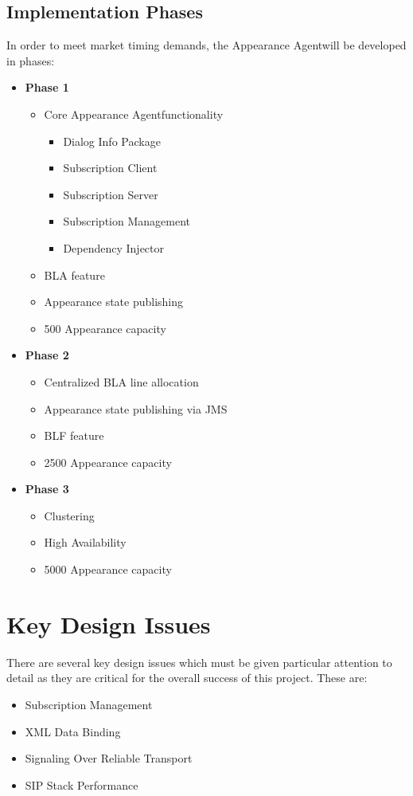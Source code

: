 \documentclass[twoside,11pt]{article}
\newcommand{\bold}[1]{\textbf{#1}}
\newcommand{\PAA}{Appearance Agent\space}
\begin{document}
\subsection{Implementation Phases}
In order to meet market timing demands, the \PAA will be developed in phases:
\begin{itemize}
  \item{\bold{Phase 1}}
  \begin{itemize}
    \item Core \PAA functionality
    \begin{itemize}
      \item Dialog Info Package
      \item Subscription Client
      \item Subscription Server
      \item Subscription Management
      \item Dependency Injector
    \end{itemize}
    \item BLA feature
    \item Appearance state publishing
    \item 500 Appearance capacity
  \end{itemize}
  
  \item{\bold{Phase 2}}
  \begin{itemize}
    \item Centralized BLA line allocation
    \item Appearance state publishing via JMS
    \item BLF feature
    \item 2500 Appearance capacity
  \end{itemize}
  
  \item{\bold{Phase 3}}
  \begin{itemize}
    \item Clustering
    \item High Availability
    \item 5000 Appearance capacity
  \end{itemize}
\end{itemize}

\section{Key Design Issues}
There are several key design issues which must be given particular attention to detail as they are
critical for the overall success of this project. These are:
\begin{itemize}
  \item Subscription Management
  \item XML Data Binding
  \item Signaling Over Reliable Transport
  \item SIP Stack Performance
\end{itemize}
  
\end{document}
